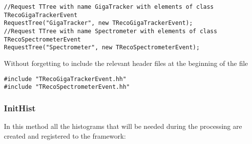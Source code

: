 \documentclass{article}
\begin{document}
\begin{lstlisting}
//Request TTree with name GigaTracker with elements of class TRecoGigaTrackerEvent
RequestTree("GigaTracker", new TRecoGigaTrackerEvent);
//Request TTree with name Spectrometer with elements of class TRecoSpectrometerEvent
RequestTree("Spectrometer", new TRecoSpectrometerEvent);
\end{lstlisting}
 
 Without forgetting to include the relevant header files at the beginning of the file
\begin{lstlisting}
#include "TRecoGigaTrackerEvent.hh"
#include "TRecoSpectrometerEvent.hh"
\end{lstlisting}

\subsubsection{InitHist}
In this method all the histograms that will be needed during the processing are created and
registered to the framework:
\end{document}
